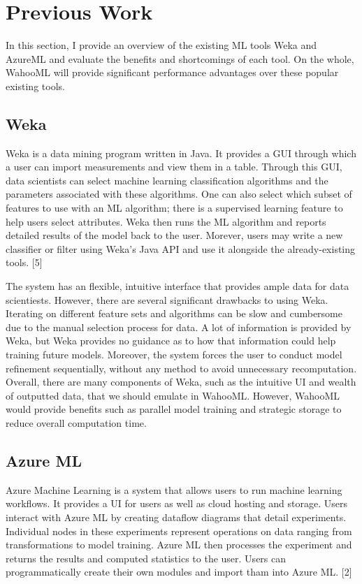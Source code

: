 \documentclass[../proposal.tex]{subfiles}
\begin{document}
\section{Previous Work}

In this section, I provide an overview of the existing ML tools Weka and
AzureML and evaluate the benefits and shortcomings of each tool. On the whole,
WahooML will provide significant performance advantages over these popular
existing tools.

\subsection{Weka}
Weka is a data mining program written in Java. It provides a GUI through which
a user can import measurements and view them in a table.  Through this GUI,
data scientists can select machine learning classification algorithms and the
parameters associated with these algorithms. One can also select which subset
of features to use with an ML algorithm; there is a supervised learning feature
to help users select attributes. Weka then runs the ML algorithm and reports
detailed results of the model back to the user. Morever, users may write a new
classifier or filter using Weka's Java API and use it alongside the
already-existing tools. [5]

The system has an flexible, intuitive interface that provides ample data for
data scientiests. However, there are several significant drawbacks to using
Weka. Iterating on different feature sets and algorithms can be slow and
cumbersome due to the manual selection process for data. A lot of information
is provided by Weka, but Weka provides no guidance as to how that information
could help training future models. Moreover, the system forces the user to
conduct model refinement sequentially, without any method to avoid unnecessary
recomputation. Overall, there are many components of Weka, such as the
intuitive UI and wealth of outputted data, that we should emulate in WahooML.
However, WahooML would provide benefits such as parallel model training and
strategic storage to reduce overall computation time.

\subsection{Azure ML}
Azure Machine Learning is a system that allows users to run machine learning
workflows. It provides a UI for users as well as cloud hosting and storage.
Users interact with Azure ML by creating dataflow diagrams that detail
experiments. Individual nodes in these experiments represent operations on data
ranging from transformations to model training. Azure ML then processes the
experiment and returns the results and computed statistics to the user. Users
can programmatically create their own modules and import tham into Azure ML. [2]
\end{document}
